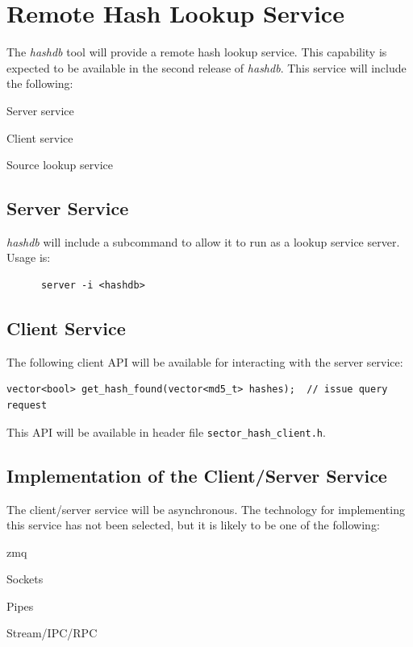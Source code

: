 \documentclass[12pt,twoside]{article}
\newcommand{\hdb}{\emph{hashdb}\xspace}
\begin{document}
\section{Remote Hash Lookup Service}
The \hdb tool will provide a remote hash lookup service.
This capability is expected to be available in the second release of \hdb.
This service will include the following:
\begin{compactitem}
\item Server service
\item Client service
\item Source lookup service
\end{compactitem}
\subsection{Server Service}
\hdb will include a subcommand to allow it to run as a lookup service server.
Usage is:
\begin{small}
\begin{verbatim}
      server -i <hashdb>
\end{verbatim}
\end{small}
\subsection{Client Service}
The following client API will be available for interacting with the server service:
\begin{small}
\begin{verbatim}
vector<bool> get_hash_found(vector<md5_t> hashes);  // issue query request
\end{verbatim}
\end{small}
This API will be available in header file \texttt{sector\_hash\_client.h}.
\subsection{Implementation of the Client/Server Service}
The client/server service will be asynchronous.
The technology for implementing this service has not been selected,
but it is likely to be one of the following:
\begin{compactitem}
\item zmq
\item Sockets
\item Pipes
\item Stream/IPC/RPC
\end{compactitem}
\end{document}
